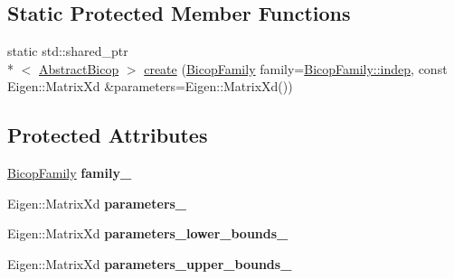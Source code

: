\subsection*{Static Protected Member Functions}
{\bf }\par
\begin{DoxyCompactItemize}
\item 
static std\+::shared\+\_\+ptr\\*
$<$ \hyperlink{classvinecopulib_1_1_abstract_bicop}{Abstract\+Bicop} $>$ \hyperlink{classvinecopulib_1_1_abstract_bicop_afefe048baabaa8cd14e849e66a45c428}{create} (\hyperlink{namespacevinecopulib_a42e95cc06d33896199caab0c11ad44f3}{Bicop\+Family} family=\hyperlink{namespacevinecopulib_a42e95cc06d33896199caab0c11ad44f3af49b022096e968010a7b9bd941805a65}{Bicop\+Family\+::indep}, const Eigen\+::\+Matrix\+Xd \&parameters=Eigen\+::\+Matrix\+Xd())
\end{DoxyCompactItemize}

\subsection*{Protected Attributes}
\begin{DoxyCompactItemize}
\item 
\hypertarget{classvinecopulib_1_1_abstract_bicop_a0b731d28eefd359b1e15951d5e58f093}{\hyperlink{namespacevinecopulib_a42e95cc06d33896199caab0c11ad44f3}{Bicop\+Family} {\bfseries family\+\_\+}}\label{classvinecopulib_1_1_abstract_bicop_a0b731d28eefd359b1e15951d5e58f093}

\item 
\hypertarget{classvinecopulib_1_1_abstract_bicop_a38f60d7c268c71bf93cfbb4203724478}{Eigen\+::\+Matrix\+Xd {\bfseries parameters\+\_\+}}\label{classvinecopulib_1_1_abstract_bicop_a38f60d7c268c71bf93cfbb4203724478}

\item 
\hypertarget{classvinecopulib_1_1_abstract_bicop_ac35229a8c8ab553321f6e4deba646d58}{Eigen\+::\+Matrix\+Xd {\bfseries parameters\+\_\+lower\+\_\+bounds\+\_\+}}\label{classvinecopulib_1_1_abstract_bicop_ac35229a8c8ab553321f6e4deba646d58}

\item 
\hypertarget{classvinecopulib_1_1_abstract_bicop_aab60ca983aac95c3ead7c07db1d227ee}{Eigen\+::\+Matrix\+Xd {\bfseries parameters\+\_\+upper\+\_\+bounds\+\_\+}}\label{classvinecopulib_1_1_abstract_bicop_aab60ca983aac95c3ead7c07db1d227ee}

\end{DoxyCompactItemize}
